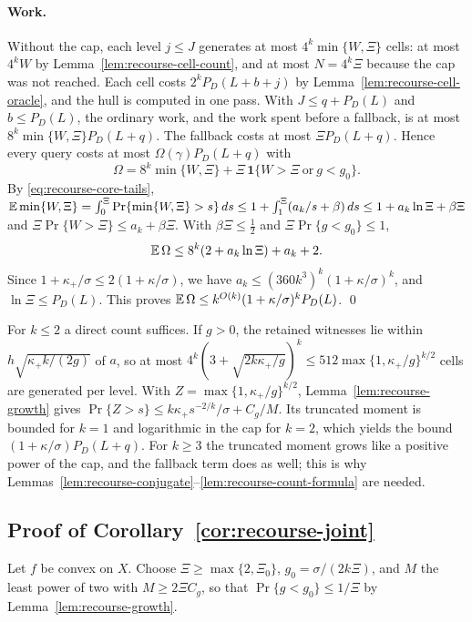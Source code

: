 \paragraph{Work.}
Without the cap, each level $j\le J$ generates at most
$4^k\min\{W,\Xi\}$ cells: at most $4^kW$ by
Lemma~\ref{lem:recourse-cell-count}, and at most $N=4^k\Xi$ because the
cap was not reached. Each cell costs $2^kP_D(L+b+j)$ by
Lemma~\ref{lem:recourse-cell-oracle}, and the hull is computed in one
pass. With $J\le q+P_D(L)$ and $b\le P_D(L)$, the ordinary work, and
the work spent before a fallback, is at most
$8^k\min\{W,\Xi\}P_D(L+q)$. The fallback costs at most
$\Xi P_D(L+q)$. Hence every query costs at most $\Omega(\gamma)P_D(L+q)$
with
\[
 \Omega=8^k\min\{W,\Xi\}+\Xi\,\mathbf1\{W>\Xi\ \text{or}\ g<g_0\}.
\]
By \eqref{eq:recourse-core-tails},
$\mathbb E\min\{W,\Xi\}=\int_0^\Xi\Pr\{\min\{W,\Xi\}>s\}\,ds
\le1+\int_1^\Xi(a_k/s+\beta)\,ds\le1+a_k\ln\Xi+\beta\Xi$ and
$\Xi\Pr\{W>\Xi\}\le a_k+\beta\Xi$. With $\beta\Xi\le\frac12$ and
$\Xi\Pr\{g<g_0\}\le1$,
\[
 \mathbb E\,\Omega\le8^k(2+a_k\ln\Xi)+a_k+2 .
\]
Since $1+\kappa_+/\sigma\le2(1+\kappa/\sigma)$, we have
$a_k\le(360k^3)^k(1+\kappa/\sigma)^k$, and $\ln\Xi\le P_D(L)$. This
proves $\mathbb E\,\Omega\le k^{O(k)}(1+\kappa/\sigma)^kP_D(L)$.
\qed

\begin{remark}
\label{rem:recourse-low-dim}
For $k\le2$ a direct count suffices. If $g>0$, the retained witnesses
lie within $h\sqrt{\kappa_+k/(2g)}$ of $a$, so at most
$4^k(3+\sqrt{2k\kappa_+/g})^k\le512\max\{1,\kappa_+/g\}^{k/2}$ cells are
generated per level. With $Z=\max\{1,\kappa_+/g\}^{k/2}$,
Lemma~\ref{lem:recourse-growth} gives
$\Pr\{Z>s\}\le k\kappa_+s^{-2/k}/\sigma+C_g/M$. Its truncated moment is
bounded for $k=1$ and logarithmic in the cap for $k=2$, which yields the
bound $(1+\kappa/\sigma)P_D(L+q)$. For $k\ge3$ the truncated moment grows
like a positive power of the cap, and the fallback term does as well;
this is why Lemmas~\ref{lem:recourse-conjugate}--\ref{lem:recourse-count-formula}
are needed.
\end{remark}

\subsection{Proof of Corollary~\ref{cor:recourse-joint}}
\label{app:recourse-joint}

Let $f$ be convex on $X$. Choose $\Xi\ge\max\{2,\Xi_0\}$, $g_0=\sigma/(2k\Xi)$,
and $M$ the least power of two with $M\ge2\Xi C_g$, so that
$\Pr\{g<g_0\}\le1/\Xi$ by Lemma~\ref{lem:recourse-growth}.

